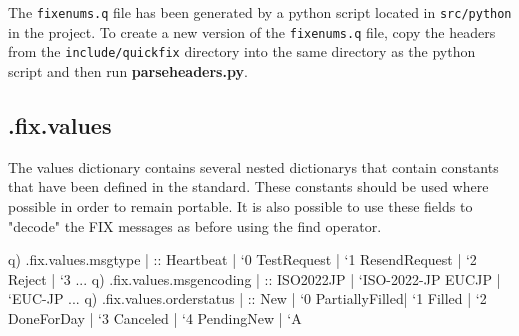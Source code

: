 The \verb|fixenums.q| file has been generated by a python script located in
\verb|src/python| in the project. To create a new version of the \verb|fixenums.q| file, copy the headers from the \verb|include/quickfix| directory into the same
directory as the python script and then run \textbf{parseheaders.py}.

\subsection{.fix.values}

The values dictionary contains several nested dictionarys that contain constants that
have been defined in the standard. These constants should be used where possible in order to remain
portable. It is also possible to use these fields to "decode" the FIX messages as before using the
find operator.

\begin{qcode}
q) .fix.values.msgtype
               | ::
Heartbeat      | `0
TestRequest    | `1
ResendRequest  | `2
Reject         | `3
...
q) .fix.values.msgencoding
               | ::
ISO2022JP      | `ISO-2022-JP
EUCJP          | `EUC-JP
...
q) .fix.values.orderstatus
               | ::
New            | `0
PartiallyFilled| `1
Filled         | `2
DoneForDay     | `3
Canceled       | `4
PendingNew     | `A
\end{qcode}
